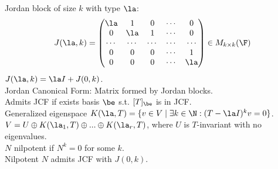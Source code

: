 \documentclass[10pt]{LatexTemplate/hw}
\begin{document}
\begin{multicols*}{2}
Jordan block of size $k$ with type $\la$: $$J(\la, k)=\begin{pmatrix}
\la & 1 & 0 & \cdots & 0\\
0 & \la & 1 & \cdots & 0\\
\cdots & \cdots & \cdots & \cdots & \cdots\\
0 & 0 & 0 & \cdots & 1\\
0 & 0 & 0 & \cdots & \la
\end{pmatrix}\in M_{k\times k}(\F)$$ $J(\la,k)=\la I+J(0,k)$.\\
Jordan Canonical Form: Matrix formed by Jordan blocks.\\
Admits JCF if exists basis $\be$ s.t. $[T]_{\be}$ is in JCF.\\
Generalized eigenspace $K(\la,T)=\{v\in V\mid \exists k\in\N: (T-\la I)^k v=0\}$.\\
$V=U\oplus K(\la_1,T)\oplus...\oplus K(\la_r,T)$, where $U$ is $T$-invariant with no eigenvalues.\\
$N$ nilpotent if $N^k=0$ for some $k$.\\
Nilpotent $N$ admits JCF with $J(0,k)$.\\

\end{multicols*}
\end{document}
